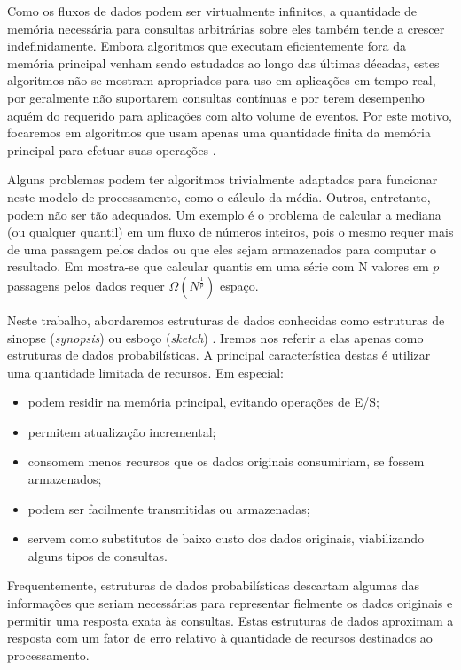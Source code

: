 Como os fluxos de dados podem ser virtualmente infinitos, a quantidade de memória necessária para consultas arbitrárias sobre eles também tende a crescer indefinidamente. Embora algoritmos que executam eficientemente fora da memória principal venham sendo estudados ao longo das últimas décadas, estes algoritmos não se mostram apropriados para uso em aplicações em tempo real, por geralmente não suportarem consultas contínuas e por terem desempenho aquém do requerido para aplicações com alto volume de eventos. Por este motivo, focaremos em algoritmos que usam apenas uma quantidade finita da memória principal para efetuar suas operações \cite{alon1996space}.

Alguns problemas podem ter algoritmos trivialmente adaptados para funcionar neste modelo de processamento, como o cálculo da média. Outros, entretanto, podem não ser tão adequados. Um exemplo é o problema de calcular a mediana (ou qualquer quantil) em um fluxo de números inteiros, pois o mesmo requer mais de uma passagem pelos dados ou que eles sejam armazenados para computar o resultado. Em \cite{munro1980selection} mostra-se que calcular quantis em uma série com N valores em $p$ passagens pelos dados requer $\Omega(N^{\frac{1}{p}})$ espaço.

Neste trabalho, abordaremos estruturas de dados conhecidas como estruturas de sinopse (\emph{synopsis}) ou esboço (\emph{sketch}) \cite{gibbons1999synopsis}. Iremos nos referir a elas apenas como estruturas de dados probabilísticas. A principal característica destas é utilizar uma quantidade limitada de recursos. Em especial:

\begin{itemize}
  \item podem residir na memória principal, evitando operações de E/S;
  \item permitem atualização incremental;
  \item consomem menos recursos que os dados originais consumiriam, se fossem armazenados;
  \item podem ser facilmente transmitidas ou armazenadas;
  \item servem como substitutos de baixo custo dos dados originais, viabilizando alguns tipos de consultas.
\end{itemize}

Frequentemente, estruturas de dados probabilísticas descartam algumas das informações que seriam necessárias para representar fielmente os dados originais e permitir uma resposta exata às consultas. Estas estruturas de dados aproximam a resposta com um fator de erro relativo à quantidade de recursos destinados ao processamento.

